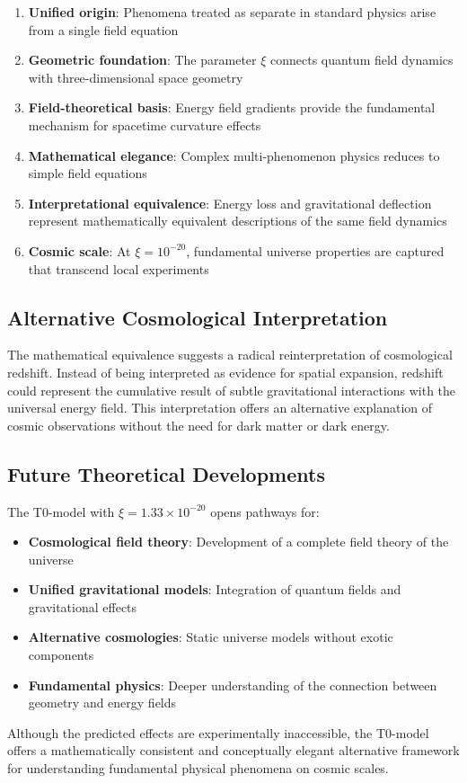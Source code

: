 \documentclass[12pt,a4paper]{article}
\theoremstyle{definition}
\begin{document}
	\begin{enumerate}
		\item \textbf{Unified origin}: Phenomena treated as separate in standard physics arise from a single field equation
		\item \textbf{Geometric foundation}: The parameter $\xi$ connects quantum field dynamics with three-dimensional space geometry
		\item \textbf{Field-theoretical basis}: Energy field gradients provide the fundamental mechanism for spacetime curvature effects
		\item \textbf{Mathematical elegance}: Complex multi-phenomenon physics reduces to simple field equations
		\item \textbf{Interpretational equivalence}: Energy loss and gravitational deflection represent mathematically equivalent descriptions of the same field dynamics
		\item \textbf{Cosmic scale}: At $\xi = 10^{-20}$, fundamental universe properties are captured that transcend local experiments
	\end{enumerate}
	
	\subsection{Alternative Cosmological Interpretation}
	
	The mathematical equivalence suggests a radical reinterpretation of cosmological redshift. Instead of being interpreted as evidence for spatial expansion, redshift could represent the cumulative result of subtle gravitational interactions with the universal energy field. This interpretation offers an alternative explanation of cosmic observations without the need for dark matter or dark energy.
	
	\subsection{Future Theoretical Developments}
	
	The T0-model with $\xi = 1.33 \times 10^{-20}$ opens pathways for:
	
	\begin{itemize}
		\item \textbf{Cosmological field theory}: Development of a complete field theory of the universe
		\item \textbf{Unified gravitational models}: Integration of quantum fields and gravitational effects
		\item \textbf{Alternative cosmologies}: Static universe models without exotic components
		\item \textbf{Fundamental physics}: Deeper understanding of the connection between geometry and energy fields
	\end{itemize}
	
	Although the predicted effects are experimentally inaccessible, the T0-model offers a mathematically consistent and conceptually elegant alternative framework for understanding fundamental physical phenomena on cosmic scales.
	
\end{document}
